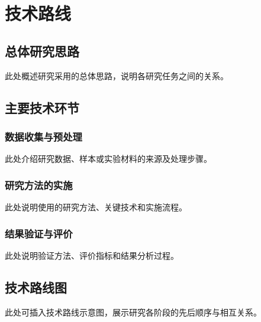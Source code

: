 \chapter{技术路线}

\section{总体研究思路}
此处概述研究采用的总体思路，说明各研究任务之间的关系。

\section{主要技术环节}
\subsection{数据收集与预处理}
此处介绍研究数据、样本或实验材料的来源及处理步骤。

\subsection{研究方法的实施}
此处说明使用的研究方法、关键技术和实施流程。

\subsection{结果验证与评价}
此处说明验证方法、评价指标和结果分析过程。

\section{技术路线图}
此处可插入技术路线示意图，展示研究各阶段的先后顺序与相互关系。
